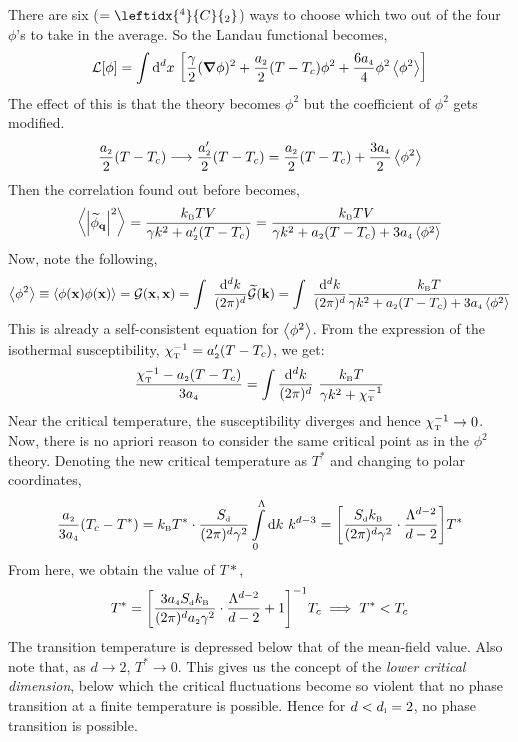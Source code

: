 There are six ($=\leftidx{^4}{C}{_2}$) ways to choose which two out of the four  $\phi$'s to take in the average. So the Landau functional becomes, 
\begin{equation}
    \mathcal L[\phi] = \int \dd^d x \ \qty[\frac{\gamma}{2} (\grad \phi)^2 + \frac{a_{\text{\tiny 2}}}{2}(T-T_c)\phi^2 + \frac{6a_{\text{\tiny 4}}}{4}\phi^2\left\langle \phi^2 \right\rangle]
\end{equation}
The effect of this is that the theory becomes $\phi^2$ but the coefficient of $\phi^2$ gets modified. 
$$\frac{a_{\text{\tiny 2}}}{2}(T-T_c) \longrightarrow \frac{a'_{\text{\tiny 2}}}{2}(T-T_c) = \frac{a_{\text{\tiny 2}}}{2}(T-T_c) + \frac{3a_{\text{\tiny 4}}}{2}\left\langle \phi^2 \right\rangle$$
Then the correlation found out before becomes, 
$$\left\langle \abs{\widetilde{\phi}_{\vb{q}}}^2 \right\rangle =  \frac{k_{\text{\tiny B}} TV}{\gamma k^2+a'_{\text{\tiny 2}}(T-T_c)} =  \frac{k_{\text{\tiny B}} TV}{\gamma k^2+a_{\text{\tiny 2}}(T-T_c)+3a_{\text{\tiny 4}}\left\langle \phi^2 \right\rangle}$$
Now, note the following, 
\begin{align*}
    \left\langle \phi^2 \right\rangle \equiv \left\langle \phi(\vb{x})\phi(\vb{x}) \right\rangle = \mathcal G(\vb{x},\vb{x}) = \int\ \frac{\dd^d k}{(2\pi)^d}\widetilde{\mathcal G}(\vb{k})= \int\ \frac{\dd^d k}{(2\pi)^d}\frac{k_{\text{\tiny B}} T}{\gamma k^2+a_{\text{\tiny 2}}(T-T_c)+3a_{\text{\tiny 4}}\left\langle \phi^2 \right\rangle}
\end{align*}
This is already a self-consistent equation for $\left\langle \phi^2 \right\rangle$. From the expression of the isothermal susceptibility, $\chi_{\text{\tiny T}}^{-1} = a'_{\text{\tiny 2}}(T-T_c)$, we get: 
\begin{equation*}
    \frac{\chi_{\text{\tiny T}}^{-1}-a_{\text{\tiny 2}}(T-T_c)}{3a_{\text{\tiny 4}}} = \int \frac{\dd^d k}{(2\pi)^d}\ \frac{k_{\text{\tiny B}} T}{\gamma k^2+\chi_{\text{\tiny T}}^{-1}}
\end{equation*}
Near the critical temperature, the susceptibility diverges and hence $\chi_{\text{\tiny T}}^{-1}\to 0$. Now, there is no apriori reason to consider the same critical point as in the $\phi^2$ theory. Denoting the new critical temperature as $T^*$ and changing to polar coordinates, 
$$\frac{a_{\text{\tiny 2}}}{3a_{\text{\tiny 4}}}(T_c-T^*) =k_{\text{\tiny B}} T^*\cdot \frac{S_{\text{\tiny d}}}{(2\pi)^d\gamma^2} \int\limits_{0}^\Lambda \dd k\  k^{d-3} = \qty[\frac{S_{\text{\tiny d}}k_{\text{\tiny B}} }{(2\pi)^d\gamma^2} \cdot \frac{ \Lambda^{d-2}}{d-2}]T^* $$
From here, we obtain the value of $T*$,
\begin{equation}
    T^* = \qty[\frac{3a_{\text{\tiny 4}}S_{\text{\tiny d}}k_{\text{\tiny B}} }{(2\pi)^da_{\text{\tiny 2}}\gamma^2} \cdot \frac{ \Lambda^{d-2}}{d-2} + 1]^{-1} T_c \implies T^* <T_c 
\end{equation}
The transition temperature is depressed below that of the mean-field value. Also note that, as $d\to 2$, $T^*\to 0$. This gives us the concept of the \textit{lower critical dimension}, below which the critical fluctuations become so violent that no phase transition at a finite temperature is possible. Hence for $d<d_{\text{\tiny l}}= 2$, no phase transition is possible.